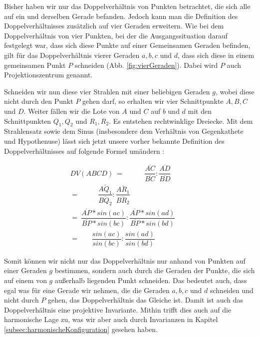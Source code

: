 \documentclass[12pt,a4paper]{article}
\begin{document}
Bisher haben wir nur das Doppelverhältnis von Punkten betrachtet, die sich alle auf ein und derselben Gerade befanden. Jedoch kann man die Definition des Doppelverhältnisses zusätzlich auf vier Geraden erweitern. Wie bei dem Doppelverhältnis von vier Punkten, bei der die Ausgangssituation darauf festgelegt war, dass sich diese Punkte auf einer Gemeinsamen Geraden befinden, gilt für das Doppelverhältnis vierer Geraden $a, b, c$ und $d$, dass sich diese in einem gemeinsamen Punkt $P$ schneiden (Abb. \ref{fig:vierGeraden}). Dabei wird $P$ auch Projektionszentrum genannt.

Schneiden wir nun diese vier Strahlen mit einer beliebigen Geraden $g$, wobei diese nicht durch den Punkt $P$ gehen darf, so erhalten wir vier Schnittpunkte $A, B, C$ und $D$. Weiter fällen wir die Lote von $A$ und $C$ auf $b$ und $d$ mit den Schnittpunkten $Q_1, Q_2$ und $R_1, R_2$. Es entstehen rechtwinklige Dreiecke. Mit dem Strahlensatz sowie dem Sinus (insbesondere dem Verhältnis von Gegenkathete und Hypothenuse) lässt sich jetzt unsere vorher bekannte Definition des Doppelverhältnisses auf folgende Formel umändern \citep[s.~][S.~80]{projektiveGeometrie}: 

\begin{equation*}
\begin{split}
DV(A B C D)~=~~~~~~~~~~~~~\dfrac{\overline{A C}}{\overline{B C}} : \dfrac{\overline{A D}}{\overline{B D}}~~~~~~~~~~~~\\
=~~~~~~~~~~~~\dfrac{\overline{A Q_1}}{\overline{B Q_2}} : \dfrac{\overline{A R_1}}{\overline{B R_2}}~~~~~~~~~~~\\
=~\dfrac{\overline{A P} * sin(ac)}{\overline{B P} * sin(bc)} : \dfrac{\overline{A P} * sin(ad)}{\overline{B P} * sin(bd)} \\
=~~~~~~~~\dfrac{sin(ac)}{sin(bc)} : \dfrac{sin(ad)}{sin(bd)}~~~~~~~~
\end{split}
\end{equation*}

Somit können wir nicht nur das Doppelverhältnis nur anhand von Punkten auf einer Geraden $g$ bestimmen, sondern auch durch die Geraden der Punkte, die sich auf einem von $g$ außerhalb liegenden Punkt schneiden. Das bedeutet auch, dass egal was für eine Gerade wir nehmen, die die Geraden $a, b, c$ und $d$ schneiden und nicht durch $P$ gehen, das Doppelverhältnis das Gleiche ist. Damit ist auch das Doppelverhältnis eine projektive Invariante. Mithin trifft dies auch auf die harmonische Lage zu, was wir aber auch durch Invarianzen in Kapitel \ref{subsec:harmonischeKonfiguration} gesehen haben.
\end{document}
